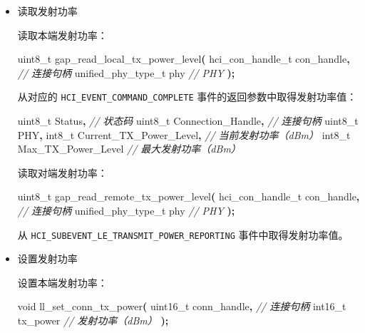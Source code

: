 \documentclass[
  12pt,
]{book}
\newenvironment{Shaded}{\begin{snugshade}}{\end{snugshade}}
\newcommand{\CommentTok}[1]{\textcolor[rgb]{0.56,0.35,0.01}{\textit{#1}}}
\newcommand{\DataTypeTok}[1]{\textcolor[rgb]{0.13,0.29,0.53}{#1}}
\newcommand{\NormalTok}[1]{#1}
\newcommand{\OperatorTok}[1]{\textcolor[rgb]{0.81,0.36,0.00}{\textbf{#1}}}
\begin{document}
\begin{itemize}
\item
  读取发射功率

  读取本端发射功率：

\begin{Shaded}
\begin{Highlighting}[]
\DataTypeTok{uint8\_t}\NormalTok{ gap\_read\_local\_tx\_power\_level}\OperatorTok{(}
\NormalTok{  hci\_con\_handle\_t con\_handle}\OperatorTok{,} \CommentTok{// 连接句柄}
\NormalTok{  unified\_phy\_type\_t phy       }\CommentTok{// PHY}
\OperatorTok{);}
\end{Highlighting}
\end{Shaded}

  从对应的 \texttt{HCI\_EVENT\_COMMAND\_COMPLETE} 事件的返回参数中取得发射功率值：

\begin{Shaded}
\begin{Highlighting}[]
\DataTypeTok{uint8\_t}\NormalTok{ Status}\OperatorTok{,}                 \CommentTok{// 状态码}
\DataTypeTok{uint8\_t}\NormalTok{ Connection\_Handle}\OperatorTok{,}      \CommentTok{// 连接句柄}
\DataTypeTok{uint8\_t}\NormalTok{ PHY}\OperatorTok{,}
 \DataTypeTok{int8\_t}\NormalTok{ Current\_TX\_Power\_Level}\OperatorTok{,} \CommentTok{// 当前发射功率（dBm）}
 \DataTypeTok{int8\_t}\NormalTok{ Max\_TX\_Power\_Level      }\CommentTok{// 最大发射功率（dBm）}
\end{Highlighting}
\end{Shaded}

  读取对端发射功率：

\begin{Shaded}
\begin{Highlighting}[]
\DataTypeTok{uint8\_t}\NormalTok{ gap\_read\_remote\_tx\_power\_level}\OperatorTok{(}
\NormalTok{  hci\_con\_handle\_t con\_handle}\OperatorTok{,} \CommentTok{// 连接句柄}
\NormalTok{  unified\_phy\_type\_t phy       }\CommentTok{// PHY}
\OperatorTok{);}
\end{Highlighting}
\end{Shaded}

  从 \texttt{HCI\_SUBEVENT\_LE\_TRANSMIT\_POWER\_REPORTING} 事件中取得发射功率值。
\item
  设置发射功率

  设置本端发射功率：

\begin{Shaded}
\begin{Highlighting}[]
\DataTypeTok{void}\NormalTok{ ll\_set\_conn\_tx\_power}\OperatorTok{(}
  \DataTypeTok{uint16\_t}\NormalTok{ conn\_handle}\OperatorTok{,} \CommentTok{// 连接句柄}
  \DataTypeTok{int16\_t}\NormalTok{ tx\_power      }\CommentTok{// 发射功率（dBm）}
\OperatorTok{);}
\end{Highlighting}
\end{Shaded}


\end{itemize}
\end{document}

